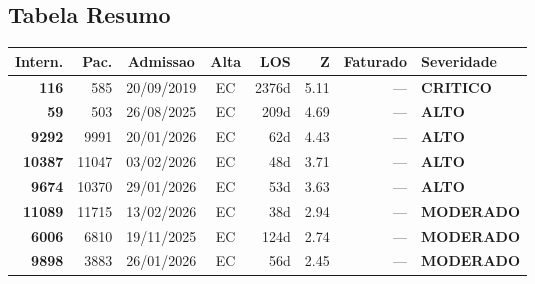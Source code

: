 \documentclass[a4paper,10pt]{article}
\begin{document}
\subsection{Tabela Resumo}
\begin{center}
\begin{longtable}{>{\scriptsize}r>{\scriptsize}r>{\scriptsize}c>{\scriptsize}c>{\scriptsize}r>{\scriptsize}r>{\scriptsize}r>{\scriptsize}l}
\toprule
\textbf{Intern.} & \textbf{Pac.} & \textbf{Admissao} & \textbf{Alta} & \textbf{LOS} & \textbf{Z} & \textbf{Faturado} & \textbf{Severidade} \\
\midrule
\endhead
\bottomrule
\endfoot

\textcolor{anomred}{\textbf{116}} & 585 & 20/09/2019 & \textcolor{anomorange}{EC} & 2376d & \textcolor{anomred}{5.11} & --- & \textcolor{anomred}{\textbf{CRITICO}} \\

\textcolor{anomorange}{\textbf{59}} & 503 & 26/08/2025 & \textcolor{anomorange}{EC} & 209d & \textcolor{anomorange}{4.69} & --- & \textcolor{anomorange}{\textbf{ALTO}} \\

\textcolor{anomorange}{\textbf{9292}} & 9991 & 20/01/2026 & \textcolor{anomorange}{EC} & 62d & \textcolor{anomorange}{4.43} & --- & \textcolor{anomorange}{\textbf{ALTO}} \\

\textcolor{anomorange}{\textbf{10387}} & 11047 & 03/02/2026 & \textcolor{anomorange}{EC} & 48d & \textcolor{anomorange}{3.71} & --- & \textcolor{anomorange}{\textbf{ALTO}} \\

\textcolor{anomorange}{\textbf{9674}} & 10370 & 29/01/2026 & \textcolor{anomorange}{EC} & 53d & \textcolor{anomorange}{3.63} & --- & \textcolor{anomorange}{\textbf{ALTO}} \\

\textcolor{anomyellow}{\textbf{11089}} & 11715 & 13/02/2026 & \textcolor{anomorange}{EC} & 38d & \textcolor{anomyellow}{2.94} & --- & \textcolor{anomyellow}{\textbf{MODERADO}} \\

\textcolor{anomyellow}{\textbf{6006}} & 6810 & 19/11/2025 & \textcolor{anomorange}{EC} & 124d & \textcolor{anomyellow}{2.74} & --- & \textcolor{anomyellow}{\textbf{MODERADO}} \\

\textcolor{anomyellow}{\textbf{9898}} & 3883 & 26/01/2026 & \textcolor{anomorange}{EC} & 56d & \textcolor{anomyellow}{2.45} & --- & \textcolor{anomyellow}{\textbf{MODERADO}} \\


\end{longtable}
\end{center}
\end{document}
